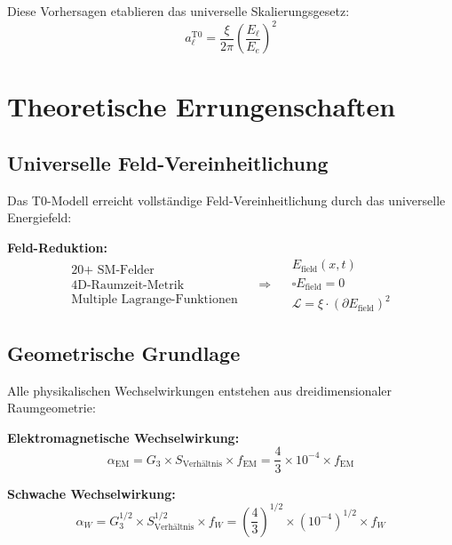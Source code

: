 \documentclass[12pt,a4paper]{report}
\begin{document}
	Diese Vorhersagen etablieren das universelle Skalierungsgesetz:
	\begin{equation}
		a_\ell^{\text{T0}} = \frac{\xi}{2\pi} \left(\frac{E_\ell}{E_e}\right)^2
	\end{equation}
	
	\section{Theoretische Errungenschaften}
	\label{sec:theoretical_achievements}
	
	\subsection{Universelle Feld-Vereinheitlichung}
	\label{subsec:universal_field_unification}
	
	Das T0-Modell erreicht vollständige Feld-Vereinheitlichung durch das universelle Energiefeld:
	
	\textbf{Feld-Reduktion:}
	\begin{equation}
		\begin{array}{c}
			\text{20+ SM-Felder} \\
			\text{4D-Raumzeit-Metrik} \\
			\text{Multiple Lagrange-Funktionen}
		\end{array} \quad \Rightarrow \quad
		\begin{array}{c}
			E_{\text{field}}(x,t) \\
			\square E_{\text{field}} = 0 \\
			\mathcal{L} = \xi \cdot (\partial E_{\text{field}})^2
		\end{array}
	\end{equation}
	
	\subsection{Geometrische Grundlage}
	\label{subsec:geometric_foundation}
	
	Alle physikalischen Wechselwirkungen entstehen aus dreidimensionaler Raumgeometrie:
	
	\textbf{Elektromagnetische Wechselwirkung:}
	\begin{equation}
		\alpha_{\text{EM}} = G_3 \times S_{\text{Verhältnis}} \times f_{\text{EM}} = \frac{4}{3} \times 10^{-4} \times f_{\text{EM}}
	\end{equation}
	
	\textbf{Schwache Wechselwirkung:}
	\begin{equation}
		\alpha_W = G_3^{1/2} \times S_{\text{Verhältnis}}^{1/2} \times f_W = \left(\frac{4}{3}\right)^{1/2} \times (10^{-4})^{1/2} \times f_W
	\end{equation}
	
\end{document}
